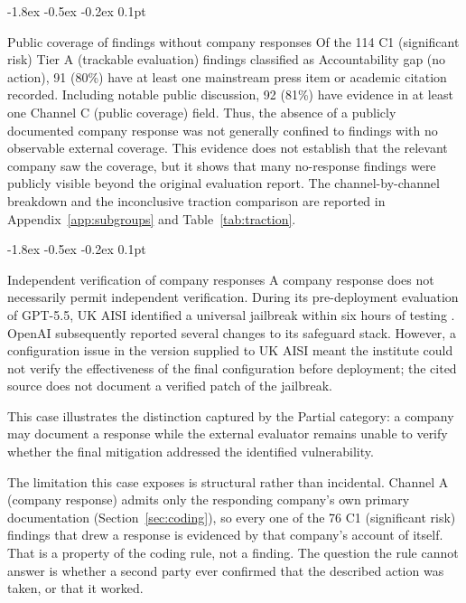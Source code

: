 \documentclass{article}
\makeatletter
\renewcommand{\subsection}{%
  \@startsection{subsection}{2}{\z@}%
                {-1.8ex \@plus -0.5ex \@minus -0.2ex}%
                {0.1pt}%
                {\normalsize\bf\raggedright}%
}
\makeatother
\begin{document}
\subsection{Public coverage of findings without company responses}\label{sec:traction}
Of the 114 C1 (significant risk) Tier A (trackable evaluation) findings classified as Accountability gap (no action), 91 (80\%) have at least one mainstream press item or academic citation recorded. Including notable public discussion, 92 (81\%) have evidence in at least one Channel C (public coverage) field. Thus, the absence of a publicly documented company response was not generally confined to findings with no observable external coverage. This evidence does not establish that the relevant company saw the coverage, but it shows that many no-response findings were publicly visible beyond the original evaluation report. The channel-by-channel breakdown and the inconclusive traction comparison are reported in Appendix~\ref{app:subgroups} and Table~\ref{tab:traction}.

\subsection{Independent verification of company responses}\label{sec:verification}
A company response does not necessarily permit independent verification. During its pre-deployment evaluation of GPT-5.5, UK AISI identified a universal jailbreak within six hours of testing \citep{openai2026gpt55}. OpenAI subsequently reported several changes to its safeguard stack. However, a configuration issue in the version supplied to UK AISI meant the institute could not verify the effectiveness of the final configuration before deployment; the cited source does not document a verified patch of the jailbreak.

This case illustrates the distinction captured by the Partial category: a company may document a response while the external evaluator remains unable to verify whether the final mitigation addressed the identified vulnerability.

The limitation this case exposes is structural rather than incidental. Channel A (company response) admits only the responding company's own primary documentation (Section~\ref{sec:coding}), so every one of the 76 C1 (significant risk) findings that drew a response is evidenced by that company's account of itself. That is a property of the coding rule, not a finding. The question the rule cannot answer is whether a second party ever confirmed that the described action was taken, or that it worked.
\end{document}
